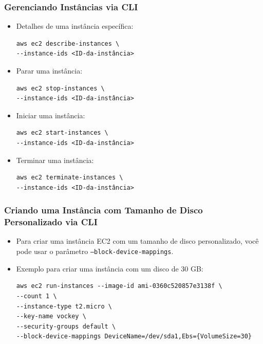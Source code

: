 \documentclass{beamer}
\begin{document}
   \begin{frame}[fragile]
      \frametitle{Gerenciando Instâncias via CLI}
      \begin{itemize}
         \item Detalhes de uma instância específica:
         \begin{verbatim}
aws ec2 describe-instances \
--instance-ids <ID-da-instância>
         \end{verbatim}
         \item Parar uma instância:
         \begin{verbatim}
aws ec2 stop-instances \
--instance-ids <ID-da-instância>
         \end{verbatim}
         \item Iniciar uma instância:
         \begin{verbatim}
aws ec2 start-instances \
--instance-ids <ID-da-instância>
         \end{verbatim}
         \item Terminar uma instância:
         \begin{verbatim} 
aws ec2 terminate-instances \
--instance-ids <ID-da-instância>
         \end{verbatim}
      \end{itemize}
   \end{frame} 

   \begin{frame}[fragile]
      \frametitle{Criando uma Instância com Tamanho de Disco Personalizado via CLI} 
      \begin{itemize}
         \item Para criar uma instância EC2 com um tamanho de disco personalizado, você pode usar o parâmetro \texttt{--block-device-mappings}.
         \item Exemplo para criar uma instância com um disco de 30 GB:
         \footnotesize
         \begin{verbatim}
aws ec2 run-instances --image-id ami-0360c520857e3138f \
--count 1 \
--instance-type t2.micro \
--key-name vockey \
--security-groups default \
--block-device-mappings DeviceName=/dev/sda1,Ebs={VolumeSize=30}
         \end{verbatim}
      \end{itemize}
   \end{frame} 
   
\end{document}
